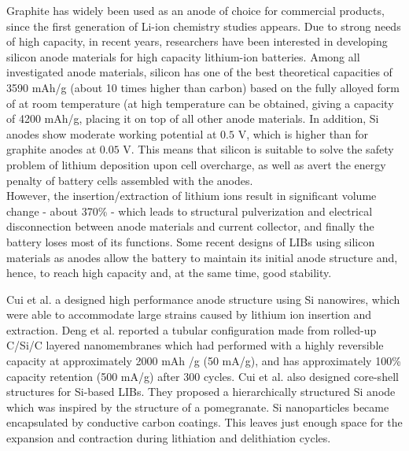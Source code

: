  Graphite has widely been used as an anode of choice for commercial products, since the first generation of Li-ion chemistry studies appears. Due to strong needs of high capacity, in recent years, researchers have been interested in developing silicon anode materials for high capacity lithium-ion batteries. Among all investigated anode materials, silicon has one of the best  theoretical capacities of 3590 mAh/g (about 10 times higher than carbon) based on the fully alloyed form of  at room temperature (at high temperature  can be obtained, giving a capacity of 4200 mAh/g, placing it on top of all other anode materials. In addition, Si anodes show moderate working potential at $0.5$ V, which is higher than for graphite anodes at $0.05 $ V. This means that silicon is suitable to solve the safety problem of lithium deposition upon cell overcharge, as well as avert the energy penalty of battery cells assembled with the  anodes.\\
 However, the insertion/extraction of lithium ions result in significant volume change - about 370\% - which leads to structural pulverization and electrical disconnection between anode materials and current collector, and finally the battery loses most of its functions. Some recent designs of LIBs using silicon materials as anodes allow the battery to maintain its initial anode structure and, hence, to reach high capacity and, at the same time, good stability. 

 Cui et al. a designed high performance anode structure using Si nanowires, which were able to accommodate large strains caused by lithium ion insertion and extraction.\cite{Cui2009} 
 Deng et al. reported a tubular configuration made from rolled-up C/Si/C layered nanomembranes which had performed with a highly reversible capacity at approximately 2000 mAh /g (50 mA/g), and has approximately 100\% capacity retention (500 mA/g) after 300 cycles.\cite{Deng2013}
 Cui et al. also designed core-shell structures for Si-based LIBs. They proposed a hierarchically structured Si anode which was inspired by the structure of a pomegranate. Si nanoparticles became encapsulated by conductive carbon coatings. This leaves just enough space for the expansion and contraction during lithiation and delithiation cycles. \cite{Liu2014d}
   

